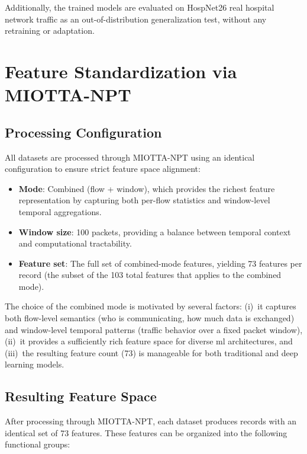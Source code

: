 Additionally, the trained models are evaluated on HospNet26 real hospital network traffic as an out-of-distribution generalization test, without any retraining or adaptation.

\section{Feature Standardization via MIOTTA-NPT}
\label{sec:feature-standardization}

\subsection{Processing Configuration}
\label{subsec:processing-config}

All datasets are processed through MIOTTA-NPT using an identical configuration to ensure strict feature space alignment:

\begin{itemize}
    \item \textbf{Mode}: Combined (flow + window), which provides the richest feature representation by capturing both per-flow statistics and window-level temporal aggregations.
    \item \textbf{Window size}: 100 packets, providing a balance between temporal context and computational tractability.
    \item \textbf{Feature set}: The full set of combined-mode features, yielding 73 features per record (the subset of the 103 total features that applies to the combined mode).
\end{itemize}

The choice of the combined mode is motivated by several factors: (i)~it captures both flow-level semantics (who is communicating, how much data is exchanged) and window-level temporal patterns (traffic behavior over a fixed packet window), (ii)~it provides a sufficiently rich feature space for diverse \gls{ml} architectures, and (iii)~the resulting feature count (73) is manageable for both traditional and deep learning models.

\subsection{Resulting Feature Space}
\label{subsec:feature-space}

After processing through MIOTTA-NPT, each dataset produces records with an identical set of 73 features. These features can be organized into the following functional groups:

